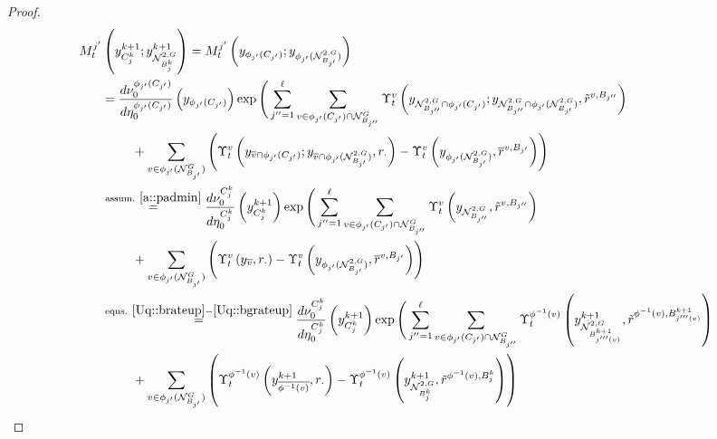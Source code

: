 \documentclass[12pt]{article}
\newcommand{\mc}{\mathcal}
\newcommand{\ov}{\overline}
\newcommand{\os}{\overset}
\newcommand{\te}{\text}
\newcommand{\gneigh}[2]{\mc{N}^{#1}_{#2}}			%
\newcommand{\dgneigh}[2]{\mc{N}^{2,#1}_{#2}}		%
\newcommand{\cl}[1]{\ov{#1}}						%
\newcommand{\indx}[1]{^{#1}}						%
\newcommand{\rate}{r}								%
\newcommand{\xg}{y}									%
\newcommand{\vind}[1]{_{#1}}						%
\newcommand{\vpara}[1]{^{#1}}						%
\newcommand{\stpara}[1]{_{#1}}						%
\newcommand{\tpara}[1]{_{#1}}						%
\newcommand{\psize}{\ell}							%
\newcommand{\brate}{\alt{\rate}}					%
\newcommand{\alt}[1]{\tilde{#1}}					%
\newcommand{\mm}{\nu}								%
\newcommand{\bgrate}{\ov{\rate}}					%
\newcommand{\mmm}{\eta}								%
\newcommand{\ds}{\Upsilon}							%
\newcommand{\mdense}{M}								%
\newcommand{\jpara}[1]{^{#1}}						%
\newcommand{\vjpara}[2]{^{#1,#2}}					%
\begin{document}
\begin{proof}
\begin{align}
\mdense\jpara{j'}\tpara{t}&\left(\xg\indx{k+1}\vind{C_j\indx{k}};\xg\indx{k+1}\vind{\dgneigh{G}{B\indx{k}_j}}\right) = \mdense\jpara{j'}\tpara{t}\left(\xg\vind{\phi_{j'}(C_{j'})};\xg\vind{\phi_{j'}(\dgneigh{G}{B_{j'}})}\right)\nonumber\\
&= \frac{d\mm\vpara{\phi_{j'}(C_{j'})}\tpara{0}}{d\mmm\vpara{\phi_{j'}(C_{j'})}\tpara{0}}\left(\xg\vind{\phi_{j'}(C_{j'})}\right)\exp\Bigg(\sum_{j'' = 1}^\psize \sum_{v \in \phi_{j'}(C_{j'})\cap\gneigh{G}{B_{j''}}} \ds\vpara{v}\tpara{t}\left(\xg\vind{\dgneigh{G}{B_{j''}}\cap\phi_{j'}(C_{j'})};\xg\vind{\dgneigh{G}{B_{j''}}\cap\phi_{j'}(\dgneigh{G}{B_{j'}})},\brate\vjpara{v}{B_{j''}}\right)\nonumber\\
&\hspace{24 pt} + \sum_{v \in \phi_{j'}(\gneigh{G}{B_{j'}})}\left(\ds\vpara{v}\tpara{t}\left(\xg\vind{\cl{v}\cap\phi_{j'}(C_{j'})};\xg\vind{\cl{v}\cap\phi_{j'}(\dgneigh{G}{B_{j'}})},\rate\stpara{\cdot}\right) - \ds\vpara{v}\tpara{t}\left(\xg\vind{\phi_{j'}(\dgneigh{G}{B_{j'}})},\bgrate\vjpara{v}{B_{j'}}\right)\right)\nonumber\\
&\os{\te{assum. }\ref{a::padmin}}{=} \frac{d\mm\vpara{C\indx{k}_j}\tpara{0}}{d\mmm\vpara{C\indx{k}_j}\tpara{0}}\left(\xg\indx{k+1}\vind{C\indx{k}_{j}}\right)\exp\Bigg(\sum_{j'' = 1}^\psize \sum_{v \in \phi_{j'}(C_{j'})\cap\gneigh{G}{B_{j''}}} \ds\vpara{v}\tpara{t}\left(\xg\vind{\dgneigh{G}{B_{j''}}},\brate\vjpara{v}{B_{j''}}\right)\nonumber\\
&\hspace{24 pt} + \sum_{v \in \phi_{j'}(\gneigh{G}{B_{j'}})}\left(\ds\vpara{v}\tpara{t}\left(\xg\vind{\cl{v}},\rate\stpara{\cdot}\right) - \ds\vpara{v}\tpara{t}\left(\xg\vind{\phi_{j'}(\dgneigh{G}{B_{j'}})},\bgrate\vjpara{v}{B_{j'}}\right)\right)\nonumber\\
&\os{\te{eqns. }\ref{Uq::brateup}-\ref{Uq::bgrateup}}{=} \frac{d\mm\vpara{C\indx{k}_j}\tpara{0}}{d\mmm\vpara{C\indx{k}_j}\tpara{0}}\left(\xg\indx{k+1}\vind{C\indx{k}_{j}}\right)\exp\Bigg(\sum_{j'' = 1}^\psize \sum_{v \in \phi_{j'}(C_{j'})\cap\gneigh{G}{B_{j''}}} \ds\vpara{\phi^{-1}(v)}\tpara{t}\left(\xg\indx{k+1}\vind{\dgneigh{G}{B\indx{k+1}_{j'''(v)}}},\brate\vjpara{\phi^{-1}(v)}{B\indx{k+1}_{j'''(v)}}\right)\nonumber\\
&\hspace{24 pt} + \sum_{v \in \phi_{j'}(\gneigh{G}{B_{j'}})}\left(\ds\vpara{\phi^{-1}(v)}\tpara{t}\left(\xg\indx{k+1}\vind{\cl{\phi^{-1}(v)}},\rate\stpara{\cdot}\right) - \ds\vpara{\phi^{-1}(v)}\tpara{t}\left(\xg\indx{k+1}\vind{\dgneigh{G}{B\indx{k}_{j}}},\brate\vjpara{\phi^{-1}(v)}{B\indx{k}_{j}}\right)\right)\nonumber\\

\end{align}
\end{proof}
\end{document}

